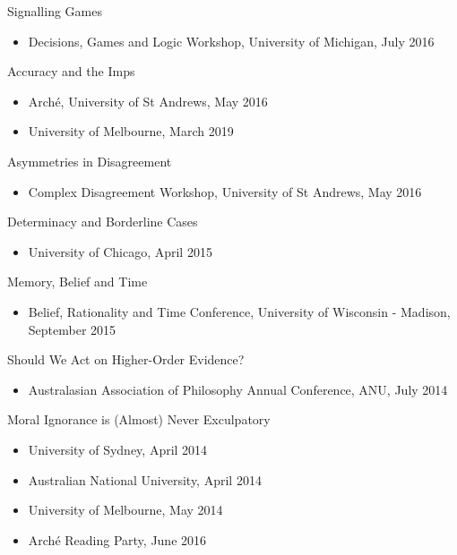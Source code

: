 \documentclass[
  10pt,
  letterpaper,
  DIV=11,
  numbers=noendperiod,
  twoside]{scrartcl}
\providecommand{\tightlist}{%
  \setlength{\itemsep}{0pt}\setlength{\parskip}{0pt}}
\begin{document}
Signalling Games

\begin{itemize}
\tightlist
\item
  Decisions, Games and Logic Workshop, University of Michigan, July 2016
\end{itemize}

Accuracy and the Imps

\begin{itemize}
\tightlist
\item
  Arché, University of St Andrews, May 2016
\item
  University of Melbourne, March 2019
\end{itemize}

Asymmetries in Disagreement

\begin{itemize}
\tightlist
\item
  Complex Disagreement Workshop, University of St Andrews, May 2016
\end{itemize}

Determinacy and Borderline Cases

\begin{itemize}
\tightlist
\item
  University of Chicago, April 2015
\end{itemize}

Memory, Belief and Time

\begin{itemize}
\tightlist
\item
  Belief, Rationality and Time Conference, University of Wisconsin -
  Madison, September 2015
\end{itemize}

Should We Act on Higher-Order Evidence?

\begin{itemize}
\tightlist
\item
  Australasian Association of Philosophy Annual Conference, ANU, July
  2014
\end{itemize}

Moral Ignorance is (Almost) Never Exculpatory

\begin{itemize}
\tightlist
\item
  University of Sydney, April 2014
\item
  Australian National University, April 2014
\item
  University of Melbourne, May 2014
\item
  Arché Reading Party, June 2016
\end{itemize}
\end{document}
